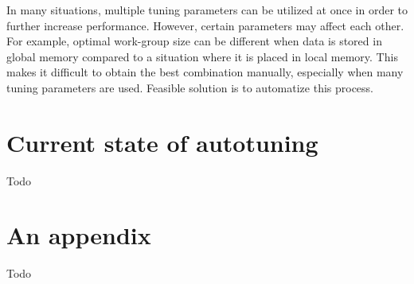 \documentclass[
  digital,     %
  oneside,     %
  nosansbold,  %
  nocolorbold, %
  lof,         %
  lot,         %
  nocover
]{fithesis4}
\begin{document}
In many situations, multiple tuning parameters can be utilized at once in order to further increase performance. However, certain parameters may affect each other. For example, optimal work-group size can be different when data is stored in global memory compared to a situation where it is placed in local memory. This makes it difficult to obtain the best combination manually, especially when many tuning parameters are used. Feasible solution is to automatize this process.

\chapter{Current state of autotuning}
Todo

\printbibliography[heading=bibintoc]

\appendix
\chapter{An appendix}
Todo
\end{document}
